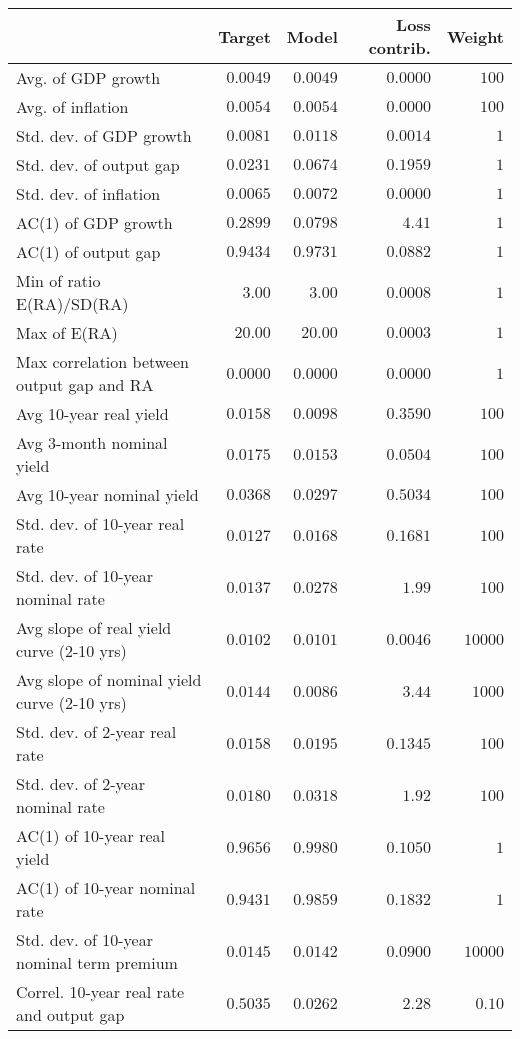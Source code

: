 \begin{tabular}{lrrrr} \hline  & Target & Model & Loss contrib. & Weight \\ \hline Avg. of GDP growth & $0.0049$ & $0.0049$ & $0.0000$ & $100$ \\ Avg. of inflation & $0.0054$ & $0.0054$ & $0.0000$ & $100$ \\ Std. dev. of GDP growth & $0.0081$ & $0.0118$ & $0.0014$ & $1$ \\ Std. dev. of output gap & $0.0231$ & $0.0674$ & $0.1959$ & $1$ \\ Std. dev. of inflation & $0.0065$ & $0.0072$ & $0.0000$ & $1$ \\ AC(1) of GDP growth & $0.2899$ & $0.0798$ & $4.41$ & $1$ \\ AC(1) of output gap & $0.9434$ & $0.9731$ & $0.0882$ & $1$ \\ Min of ratio E(RA)/SD(RA) & $3.00$ & $3.00$ & $0.0008$ & $1$ \\ Max of E(RA) & $20.00$ & $20.00$ & $0.0003$ & $1$ \\ Max correlation between output gap and RA & $0.0000$ & $0.0000$ & $0.0000$ & $1$ \\ Avg 10-year real yield & $0.0158$ & $0.0098$ & $0.3590$ & $100$ \\ Avg 3-month nominal yield & $0.0175$ & $0.0153$ & $0.0504$ & $100$ \\ Avg 10-year nominal yield & $0.0368$ & $0.0297$ & $0.5034$ & $100$ \\ Std. dev. of 10-year real rate & $0.0127$ & $0.0168$ & $0.1681$ & $100$ \\ Std. dev. of 10-year nominal rate & $0.0137$ & $0.0278$ & $1.99$ & $100$ \\ Avg slope of real yield curve (2-10 yrs) & $0.0102$ & $0.0101$ & $0.0046$ & $10000$ \\ Avg slope of nominal yield curve (2-10 yrs) & $0.0144$ & $0.0086$ & $3.44$ & $1000$ \\ Std. dev. of 2-year real rate & $0.0158$ & $0.0195$ & $0.1345$ & $100$ \\ Std. dev. of 2-year nominal rate & $0.0180$ & $0.0318$ & $1.92$ & $100$ \\ AC(1) of 10-year real yield & $0.9656$ & $0.9980$ & $0.1050$ & $1$ \\ AC(1) of 10-year nominal rate & $0.9431$ & $0.9859$ & $0.1832$ & $1$ \\ Std. dev. of 10-year nominal term premium & $0.0145$ & $0.0142$ & $0.0900$ & $10000$ \\ Correl. 10-year real rate and output gap & $0.5035$ & $0.0262$ & $2.28$ & $0.10$ \\ \hline \end{tabular}
